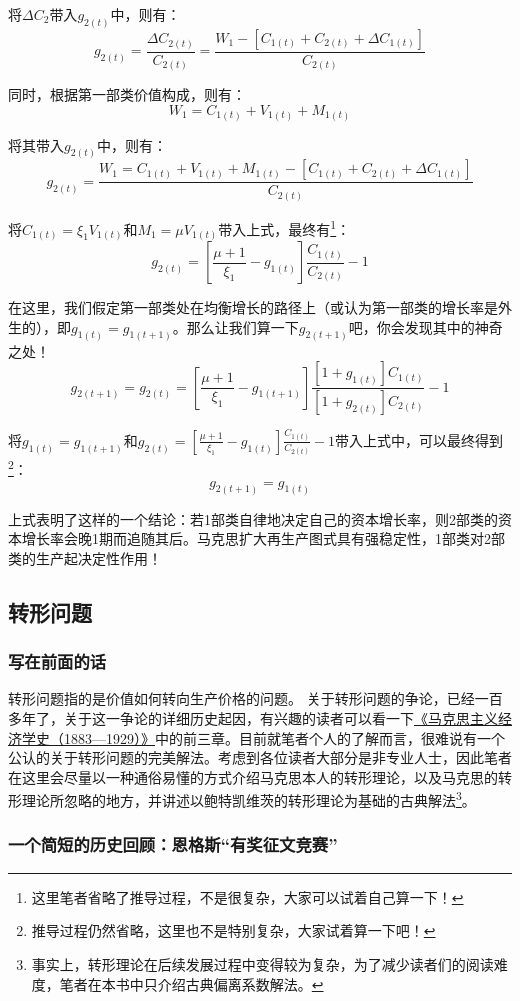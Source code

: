 \documentclass[a4paper,twoside,12pt,AutoFakeBold]{ctexart}
\begin{document}
将$\Delta C_2$带入$g_{2(t)}$中，则有：
$$
g_{2(t)}= \frac{\Delta C_{2(t)}}{C_{2(t)}}=\frac{W_1 -[C_{1(t)}+C_{2(t)}+\Delta C_{1(t)}]}{C_{2(t)}}
$$

同时，根据第一部类价值构成，则有：
$$
W_1=C_{1(t)}+V_{1(t)}+M_{1(t)}
$$

将其带入$g_{2(t)}$中，则有：
$$
g_{2(t)}= \frac{W_1=C_{1(t)}+V_{1(t)}+M_{1(t)}-[C_{1(t)}+C_{2(t)}+\Delta C_{1(t)}]}{C_{2(t)}}
$$

将$C_{1(t)}=\xi_{1} V_{1(t)}$和$M_1=\mu V_{1(t)}$带入上式，最终有\footnote{这里笔者省略了推导过程，不是很复杂，大家可以试着自己算一下！}：
$$
g_{2(t)}= [\frac{\mu + 1}{\xi_1}-g_{1(t)}]\frac{C_{1(t)}}{C_{2(t)}}-1
$$

在这里，我们假定第一部类处在均衡增长的路径上（或认为第一部类的增长率是外生的），即$g_{1(t)}=g_{1(t+1)}$。那么让我们算一下$g_{2(t+1)}$吧，你会发现其中的神奇之处！
$$
g_{2(t+1)}=g_{2(t)}= [\frac{\mu + 1}{\xi_1}-g_{1(t+1)}]\frac{[1+g_{1(t)}]C_{1(t)}}{[1+g_{2(t)}]C_{2(t)}}-1
$$

将$g_{1(t)}=g_{1(t+1)}$和$g_{2(t)}= [\frac{\mu + 1}{\xi_1}-g_{1(t)}]\frac{C_{1(t)}}{C_{2(t)}}-1$带入上式中，可以最终得到\footnote{推导过程仍然省略，这里也不是特别复杂，大家试着算一下吧！}：
$$
g_{2(t+1)}=g_{1(t)}
$$

上式表明了这样的一个结论：若1部类自律地决定自己的资本增长率，则2部类的资本增长率会晚1期而追随其后。马克思扩大再生产图式具有强稳定性，1部类对2部类的生产起决定性作用！

\subsection{转形问题}
\subsubsection{写在前面的话}
转形问题指的是价值如何转向生产价格的问题。
关于转形问题的争论，已经一百多年了，关于这一争论的详细历史起因，有兴趣的读者可以看一下\href{https://www.marxists.org/chinese/reference-books/howard-1883-1929/index.htm}{《马克思主义经济学史（1883—1929）》}中的前三章。目前就笔者个人的了解而言，很难说有一个公认的关于转形问题的完美解法。考虑到各位读者大部分是非专业人士，因此笔者在这里会尽量以一种通俗易懂的方式介绍马克思本人的转形理论，以及马克思的转形理论所忽略的地方，并讲述以鲍特凯维茨的转形理论为基础的古典解法\footnote{事实上，转形理论在后续发展过程中变得较为复杂，为了减少读者们的阅读难度，笔者在本书中只介绍古典偏离系数解法。}。



\subsubsection{一个简短的历史回顾：恩格斯“有奖征文竞赛”}
\end{document}
